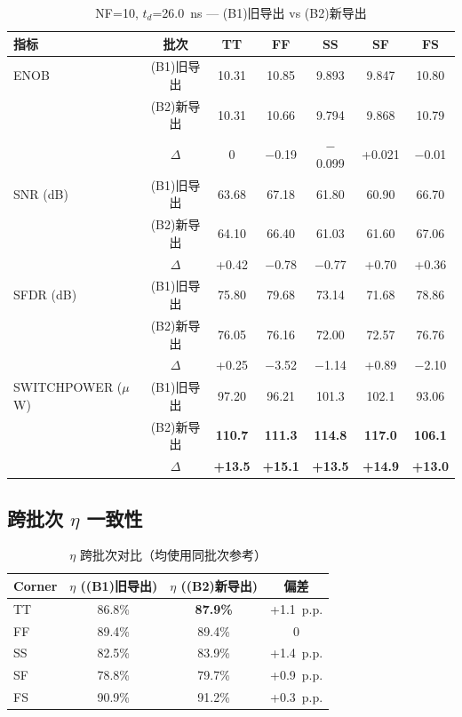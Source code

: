 \documentclass[11pt,a4paper,UTF8]{ctexart}
\newcommand{\keydata}[1]{\textbf{\color{primaryblue}#1}}
\begin{document}
\begin{table}[htbp]
\centering
\caption{NF=10, $t_d$=26.0~ns --- (B1)旧导出 vs (B2)新导出}
\label{tab:batch-comparison}
\small
\setlength{\tabcolsep}{3pt}
\begin{tabular}{lcccccc}
\toprule
\textbf{指标} & \textbf{批次} & \textbf{TT} & \textbf{FF} & \textbf{SS} & \textbf{SF} & \textbf{FS} \\
\midrule
ENOB & (B1)旧导出 & 10.31 & 10.85 & 9.893 & 9.847 & 10.80 \\
      & (B2)新导出 & 10.31 & 10.66 & 9.794 & 9.868 & 10.79 \\
      & $\Delta$ & 0 & $-$0.19 & $-$0.099 & +0.021 & $-$0.01 \\
\midrule
SNR (dB) & (B1)旧导出 & 63.68 & 67.18 & 61.80 & 60.90 & 66.70 \\
         & (B2)新导出 & 64.10 & 66.40 & 61.03 & 61.60 & 67.06 \\
         & $\Delta$ & +0.42 & $-$0.78 & $-$0.77 & +0.70 & +0.36 \\
\midrule
SFDR (dB) & (B1)旧导出 & 75.80 & 79.68 & 73.14 & 71.68 & 78.86 \\
          & (B2)新导出 & 76.05 & 76.16 & 72.00 & 72.57 & 76.76 \\
          & $\Delta$ & +0.25 & $-$3.52 & $-$1.14 & +0.89 & $-$2.10 \\
\midrule
SWITCHPOWER ($\mu$W) & (B1)旧导出 & 97.20 & 96.21 & 101.3 & 102.1 & 93.06 \\
                      & (B2)新导出 & \textbf{110.7} & \textbf{111.3} & \textbf{114.8} & \textbf{117.0} & \textbf{106.1} \\
                      & $\Delta$ & \textbf{+13.5} & \textbf{+15.1} & \textbf{+13.5} & \textbf{+14.9} & \textbf{+13.0} \\
\bottomrule
\end{tabular}
\normalsize
\end{table}

\subsection{跨批次 $\eta$ 一致性}

\begin{table}[htbp]
\centering
\caption{$\eta$ 跨批次对比（均使用同批次参考）}
\label{tab:eta-cross}
\begin{tabular}{lccc}
\toprule
\textbf{Corner} & $\eta$ ((B1)旧导出) & $\eta$ ((B2)新导出) & \textbf{偏差} \\
\midrule
TT & 86.8\% & \keydata{87.9\%} & +1.1~p.p. \\

FF & 89.4\% & 89.4\% & 0 \\
SS & 82.5\% & 83.9\% & +1.4~p.p. \\

SF & 78.8\% & 79.7\% & +0.9~p.p. \\
FS & 90.9\% & 91.2\% & +0.3~p.p. \\
\bottomrule
\end{tabular}
\end{table}
\end{document}
